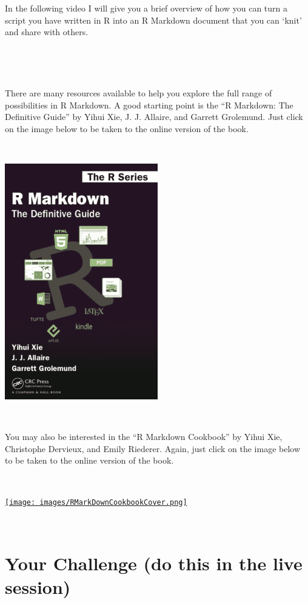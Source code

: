 \documentclass[
]{book}
\begin{document}
In the following video I will give you a brief overview of how you can turn a script you have written in R into an R Markdown document that you can `knit' and share with others.

~~

~~

There are many resources available to help you explore the full range of possibilities in R Markdown. A good starting point is the ``R Markdown: The Definitive Guide'' by Yihui Xie, J. J. Allaire, and Garrett Grolemund. Just click on the image below to be taken to the online version of the book.

~~

\href{https://bookdown.org/yihui/rmarkdown/}{\includegraphics[width=0.5\textwidth,height=\textheight]{images/r_markdown_guide.png}}

~~

You may also be interested in the ``R Markdown Cookbook'' by Yihui Xie, Christophe Dervieux, and Emily Riederer. Again, just click on the image below to be taken to the online version of the book.

~~

\href{https://bookdown.org/yihui/rmarkdown-cookbook/}{\texttt{[image: images/RMarkDownCookbookCover.png]}}

~~

\hypertarget{your-challenge-do-this-in-the-live-session-1}{%
\section{Your Challenge (do this in the live session)}\label{your-challenge-do-this-in-the-live-session-1}}
\end{document}
